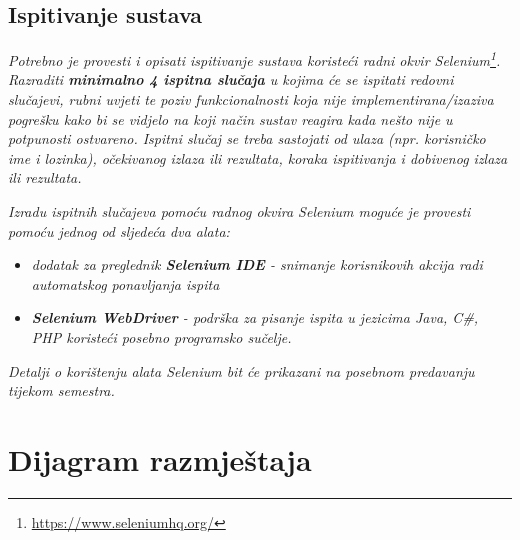 			\subsection{Ispitivanje sustava}
			
			 \textit{Potrebno je provesti i opisati ispitivanje sustava koristeći radni okvir Selenium\footnote{\url{https://www.seleniumhq.org/}}. Razraditi \textbf{minimalno 4 ispitna slučaja} u kojima će se ispitati redovni slučajevi, rubni uvjeti te poziv funkcionalnosti koja nije implementirana/izaziva pogrešku kako bi se vidjelo na koji način sustav reagira kada nešto nije u potpunosti ostvareno. Ispitni slučaj se treba sastojati od ulaza (npr. korisničko ime i lozinka), očekivanog izlaza ili rezultata, koraka ispitivanja i dobivenog izlaza ili rezultata.\\ }
			 
			 \textit{Izradu ispitnih slučajeva pomoću radnog okvira Selenium moguće je provesti pomoću jednog od sljedeća dva alata:}
			 \begin{itemize}
			 	\item \textit{dodatak za preglednik \textbf{Selenium IDE} - snimanje korisnikovih akcija radi automatskog ponavljanja ispita	}
			 	\item \textit{\textbf{Selenium WebDriver} - podrška za pisanje ispita u jezicima Java, C\#, PHP koristeći posebno programsko sučelje.}
			 \end{itemize}
		 	\textit{Detalji o korištenju alata Selenium bit će prikazani na posebnom predavanju tijekom semestra.}
			
			\eject 
		
		
		\section{Dijagram razmještaja}
			
			
